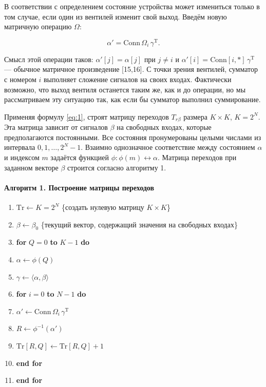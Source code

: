 \documentclass[a4paper,12pt]{article}
\begin{document}
В соответствии с определением состояние устройства может измениться только в том случае, если один из вентилей изменит свой выход. Введём новую матричную операцию \(\Omega\):

\begin{equation}
\alpha' = \mathrm{Conn} \, \Omega_i \, \gamma^{\mathrm{T}}. \label{eq:1}
\end{equation}

Смысл этой операции таков: \(\alpha'[j] = \alpha[j]\) при \(j \neq i\) и \(\alpha'[i] = \mathrm{Conn}[i,*] \, \gamma^{\mathrm{T}}\) --- обычное матричное произведение [15,16]. С точки зрения вентилей, сумматор с номером \(i\) выполняет сложение сигналов на своих входах. Фактически возможно, что выход вентиля останется таким же, как и до операции, но мы рассматриваем эту ситуацию так, как если бы сумматор выполнил суммирование.

Применяя формулу \eqref{eq:1}, строят матрицу переходов \(T_{r\beta}\) размера \(K \times K\), \(K = 2^N\). Эта матрица зависит от сигналов \(\beta\) на свободных входах, которые предполагаются постоянными. Все состояния пронумерованы целыми числами из интервала \(0,1,\dots,2^N - 1\). Взаимно однозначное соответствие между состоянием \(\alpha\) и индексом \(m\) задаётся функцией \(\phi: \phi(m) \leftrightarrow \alpha\). Матрица переходов при заданном векторе \(\beta\) строится согласно алгоритму 1.

\paragraph{Алгоритм 1. Построение матрицы переходов}
\begin{enumerate}
\item \(\mathrm{Tr} \leftarrow K = 2^N\) \{создать нулевую матрицу \(K \times K\)\}
\item \(\beta \leftarrow \beta_0\) \{текущий вектор, содержащий значения на свободных входах\}
\item \textbf{for} \(Q = 0\) \textbf{to} \(K-1\) \textbf{do}
\item \quad \(\alpha \leftarrow \phi(Q)\)
\item \quad \(\gamma \leftarrow \langle \alpha, \beta \rangle\)
\item \quad \textbf{for} \(i = 0\) \textbf{to} \(N-1\) \textbf{do}
\item \quad\quad \(\alpha' \leftarrow \mathrm{Conn} \, \Omega_i \, \gamma^{\mathrm{T}}\)
\item \quad\quad \(R \leftarrow \phi^{-1}(\alpha')\)
\item \quad\quad \(\mathrm{Tr}[R,Q] \leftarrow \mathrm{Tr}[R,Q] + 1\)
\item \quad \textbf{end for}
\item \textbf{end for}
\end{enumerate}
\end{document}
